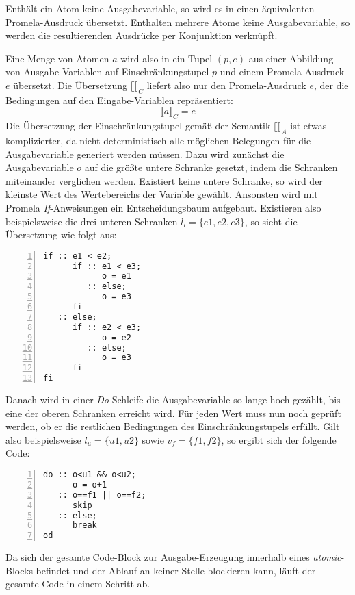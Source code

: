 Enthält ein Atom keine Ausgabevariable, so wird es in einen äquivalenten Promela-Ausdruck übersetzt.
Enthalten mehrere Atome keine Ausgabevariable, so werden die resultierenden Ausdrücke per Konjunktion verknüpft.

Eine Menge von Atomen $a$ wird also in ein Tupel $(p,e)$ aus einer Abbildung von Ausgabe-Variablen auf Einschränkungstupel $p$ und einem Promela-Ausdruck $e$ übersetzt.
Die Übersetzung $\llbracket \rrbracket_C$ liefert also nur den Promela-Ausdruck $e$, der die Bedingungen auf den Eingabe-Variablen repräsentiert:
\[ \llbracket a\rrbracket_C = e \]
Die Übersetzung der Einschränkungstupel gemäß der Semantik $\llbracket\rrbracket_A$ ist etwas komplizierter, da nicht-deterministisch alle möglichen Belegungen für die Ausgabevariable generiert werden müssen.
Dazu wird zunächst die Ausgabevariable $o$ auf die größte untere Schranke gesetzt, indem die Schranken miteinander verglichen werden.
Existiert keine untere Schranke, so wird der kleinste Wert des Wertebereichs der Variable gewählt.
Ansonsten wird mit Promela \emph{If}-Anweisungen ein Entscheidungsbaum aufgebaut.
Existieren also beispielsweise die drei unteren Schranken $l_l = \{ e1,e2,e3\}$, so sieht die Übersetzung wie folgt aus:
\begin{lstlisting}[language=promela,numbers=left,caption={Berechnung der unteren Schranke}]
if :: e1 < e2;
      if :: e1 < e3;
            o = e1
         :: else;
            o = e3
      fi
   :: else;
      if :: e2 < e3;
            o = e2
         :: else;
            o = e3
      fi
fi
\end{lstlisting}
Danach wird in einer \emph{Do}-Schleife die Ausgabevariable so lange hoch gezählt, bis eine der oberen Schranken erreicht wird.
Für jeden Wert muss nun noch geprüft werden, ob er die restlichen Bedingungen des Einschränkungstupels erfüllt.
Gilt also beispielsweise $l_u = \{ u1,u2 \}$ sowie $v_f=\{ f1, f2 \}$, so ergibt sich der folgende Code:
\begin{lstlisting}[language=promela,numbers=left,firstnumber=last,caption={Generierung von möglichen Werten}]
do :: o<u1 && o<u2;
      o = o+1
   :: o==f1 || o==f2;
      skip
   :: else;
      break
od
\end{lstlisting}
Da sich der gesamte Code-Block zur Ausgabe-Erzeugung innerhalb eines \emph{atomic}-Blocks befindet und der Ablauf an keiner Stelle blockieren kann, läuft der gesamte Code in einem Schritt ab.